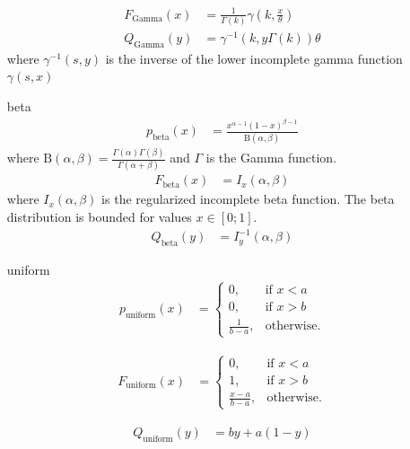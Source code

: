 \begin{itemize}
\begin{align}
F_\mathrm{Gamma}(x)&={\frac {1}{\Gamma (k)}}\gamma \left(k,{\frac {x}{\theta }}\right) \\
Q_\mathrm{Gamma}(y) &= \gamma^{-1}\left(k,y\Gamma(k)\right)\theta
\end{align}
where
$\gamma^{-1}(s,y)$ is the inverse of the lower incomplete gamma function
$\gamma(s,x)$
\item[beta]
\begin{align}
p_\mathrm{beta}(x) &=\frac {x^{\alpha -1}(1-x)^{\beta -1}}{\mathrm {B} (\alpha ,\beta )}
\end{align}
where $\mathrm {B} (\alpha ,\beta )={\frac {\Gamma (\alpha )\Gamma (\beta )}{\Gamma (\alpha +\beta )}}$ and
$\Gamma$ is the Gamma function.
\begin{align}
F_\mathrm{beta}(x) &=I_{x}(\alpha ,\beta )
\end{align}
where $I_{x}(\alpha ,\beta )$ is the regularized incomplete beta function. The beta distribution is bounded for values $x\in [0;1]$.
\begin{align}
Q_\mathrm{beta}(y) &= I^{-1}_{y}(\alpha ,\beta )
\end{align}
\item[uniform]
\begin{align}
p_\mathrm{uniform}(x) &= \begin{cases}
                           0, & \mbox{if } x<a \\
                           0, & \mbox{if } x>b \\
                           \frac{1}{b-a}, & \mbox{otherwise}.
                         \end{cases}
\end{align}

\begin{align}
F_\mathrm{uniform}(x) &= \begin{cases}
                           0, & \mbox{if } x<a \\
                           1, & \mbox{if } x>b \\
                           \frac{x-a}{b-a}, & \mbox{otherwise}.
                         \end{cases}
\end{align}

\begin{align}
Q_\mathrm{uniform}(y) &= b y+a(1-y)
\end{align}


\end{itemize}

